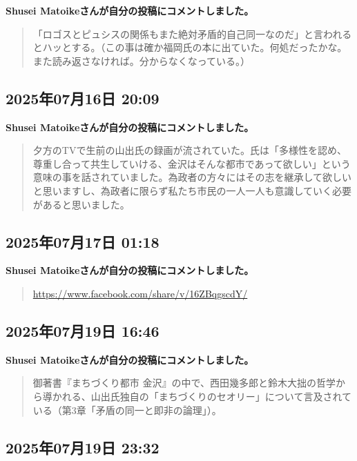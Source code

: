 \textbf{Shusei Matoikeさんが自分の投稿にコメントしました。}

\begin{quote}
「ロゴスとピュシスの関係もまた絶対矛盾的自己同一なのだ」と言われるとハッとする。（この事は確か福岡氏の本に出ていた。何処だったかな。また読み返さなければ。分からなくなっている。）
\end{quote}

\subsection*{2025年07月16日 20:09}

\textbf{Shusei Matoikeさんが自分の投稿にコメントしました。}

\begin{quote}
夕方のTVで生前の山出氏の録画が流されていた。氏は「多様性を認め、尊重し合って共生していける、金沢はそんな都市であって欲しい」という意味の事を話されていました。為政者の方々にはその志を継承して欲しいと思いますし、為政者に限らず私たち市民の一人一人も意識していく必要があると思いました。
\end{quote}

\subsection*{2025年07月17日 01:18}

\textbf{Shusei Matoikeさんが自分の投稿にコメントしました。}

\begin{quote}
\url{https://www.facebook.com/share/v/16ZBqgscdY/}
\end{quote}

\subsection*{2025年07月19日 16:46}

\textbf{Shusei Matoikeさんが自分の投稿にコメントしました。}

\begin{quote}
御著書『まちづくり都市 金沢』の中で、西田幾多郎と鈴木大拙の哲学から導かれる、山出氏独自の「まちづくりのセオリー」について言及されている（第3章「矛盾の同一と即非の論理」）。
\end{quote}

\subsection*{2025年07月19日 23:32}

